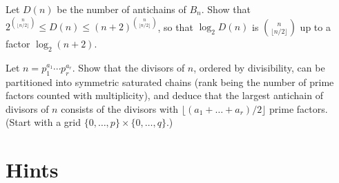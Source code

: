 \begin{exercise}[$\star\star$]\label{ex:hansel}
Let $D(n)$ be the number of antichains of $B_n$. Show that $2^{\binom n{\lfloor n/2\rfloor}}\le D(n)\le(n+2)^{\binom n{\lfloor n/2\rfloor}}$, so that $\log_2D(n)$ is $\binom n{\lfloor n/2\rfloor}$ up to a factor
$\log_2(n+2)$.
\end{exercise}

\begin{exercise}[$\star\star\star$]\label{ex:divisorscd}
Let $n=p_1^{a_1}\cdots p_r^{a_r}$. Show that the divisors of $n$, ordered by divisibility, can be partitioned into symmetric
saturated chains (rank being the number of prime factors counted with multiplicity), and deduce that the largest
antichain of divisors of $n$ consists of the divisors with $\lfloor(a_1+\dots+a_r)/2\rfloor$ prime factors. (Start with a grid
$\{0,\dots,p\}\times\{0,\dots,q\}$.)
\end{exercise}

\section{Hints}

